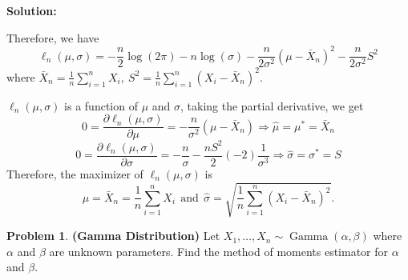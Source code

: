 \documentclass[13pt]{article}
\theoremstyle{definition}
\newtheorem{problem}[theorem]{Problem}
\newenvironment{solution}
{\color{C2}\begin{framed}\begingroup\textbf{Solution:} }
  {\endgroup\end{framed}}
\theoremstyle{remark}
\begin{document}
\begin{solution}
\begin{enumerate}[label=(\alph*),topsep=0pt]
        Therefore, we have
        \[
        \ell_n(\mu, \sigma) = -\frac{n}{2}\log(2\pi) -n\log(\sigma) -\frac{n}{2\sigma^2}\left(\mu - \bar{X}_n\right)^2-\frac{n}{2\sigma^2}S^2
        \]
        where $\bar{X}_n=\frac{1}{n}\sum_{i=1}^n X_i, \ S^2 = \frac{1}{n}\sum_{i=1}^n (X_i-\bar{X}_n)^2$.
        
        $\ell_n(\mu, \sigma)$ is a function of $\mu$ and $\sigma$, taking the partial derivative, we get
        \[
        0=\frac{\partial \ell_n(\mu, \sigma)}{\partial \mu} = -\frac{n}{\sigma^2}(\mu -\bar{X}_n) \Longrightarrow \hat{\mu} = \mu^* = \bar{X}_n
        \]
        \[
        0=\frac{\partial \ell_n(\mu, \sigma)}{\partial \sigma} = -\frac{n}{\sigma} -\frac{nS^2}{2}(-2)\frac{1}{\sigma^3} \Longrightarrow \hat{\sigma} = \sigma^* = S
        \]
        Therefore, the maximizer of $\ell_n(\mu, \sigma)$ is \[\hat{\mu}  = \bar{X}_n =\frac{1}{n}\sum_{i=1}^n X_i \ \ \text{and} \  \ \hat{\sigma} = \sqrt{\frac{1}{n}\sum_{i=1}^n (X_i-\bar{X}_n)^2}.\]
    \end{enumerate}
\end{solution}

\begin{problem}\textbf{(Gamma Distribution)}
    Let $X_1, \ldots, X_n \sim \operatorname{Gamma}(\alpha,\beta)$ where $\alpha$ and $\beta$ are unknown parameters.
    Find the method of moments estimator for $\alpha$ and $\beta$.
\end{problem}
\end{document}
